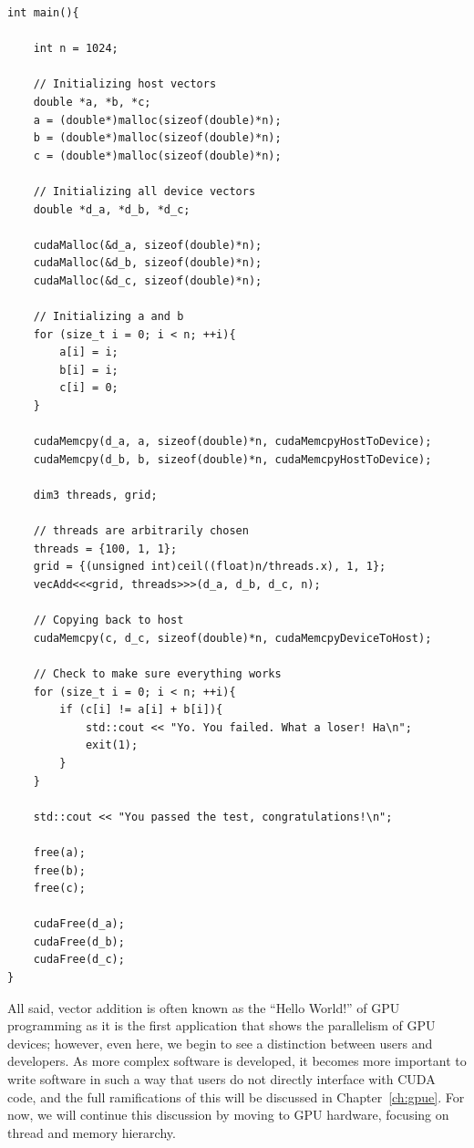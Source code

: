 \begin{lstlisting}[float,label=lst:vecaddCUDA2, style=c++,caption={An example of host code to run Listing~\ref{lst:vecaddCUDA2}.}]
int main(){

    int n = 1024;

    // Initializing host vectors
    double *a, *b, *c;
    a = (double*)malloc(sizeof(double)*n);
    b = (double*)malloc(sizeof(double)*n);
    c = (double*)malloc(sizeof(double)*n);

    // Initializing all device vectors
    double *d_a, *d_b, *d_c;

    cudaMalloc(&d_a, sizeof(double)*n);
    cudaMalloc(&d_b, sizeof(double)*n);
    cudaMalloc(&d_c, sizeof(double)*n);

    // Initializing a and b
    for (size_t i = 0; i < n; ++i){
        a[i] = i;
        b[i] = i;
        c[i] = 0;
    }

    cudaMemcpy(d_a, a, sizeof(double)*n, cudaMemcpyHostToDevice);
    cudaMemcpy(d_b, b, sizeof(double)*n, cudaMemcpyHostToDevice);

    dim3 threads, grid;

    // threads are arbitrarily chosen
    threads = {100, 1, 1};
    grid = {(unsigned int)ceil((float)n/threads.x), 1, 1};
    vecAdd<<<grid, threads>>>(d_a, d_b, d_c, n);

    // Copying back to host
    cudaMemcpy(c, d_c, sizeof(double)*n, cudaMemcpyDeviceToHost);

    // Check to make sure everything works
    for (size_t i = 0; i < n; ++i){
        if (c[i] != a[i] + b[i]){
            std::cout << "Yo. You failed. What a loser! Ha\n";
            exit(1);
        }
    }

    std::cout << "You passed the test, congratulations!\n";

    free(a);
    free(b);
    free(c);

    cudaFree(d_a);
    cudaFree(d_b);
    cudaFree(d_c);
}
\end{lstlisting}

All said, vector addition is often known as the ``Hello World!'' of GPU programming as it is the first application that shows the parallelism of GPU devices; however, even here, we begin to see a distinction between users and developers.
As more complex software is developed, it becomes more important to write software in such a way that users do not directly interface with CUDA code, and the full ramifications of this will be discussed in Chapter~\ref{ch:gpue}.
For now, we will continue this discussion by moving to GPU hardware, focusing on thread and memory hierarchy.


